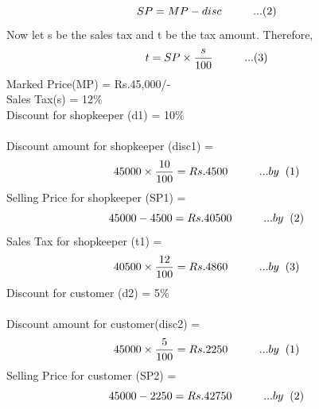 \documentclass[12pt, twocolumn]{article}
\begin{document}
\begin{equation*}
    SP = MP - disc \hspace{1cm}...(2)\\ \\
\end{equation*}
Now let s be the sales tax and t be the tax amount. Therefore,\\
\begin{equation*}
    t = SP\times\frac{s}{100} \hspace{1cm}...(3)\\ \\ \\
\end{equation*}
Marked  Price(MP) = Rs.45,000/- \\
Sales  Tax(s) = 12\% \\
Discount  for  shopkeeper (d1) = 10\% \\ \\
Discount  amount for shopkeeper (disc1) =  \begin{equation*}
    45000\times\frac{10}{100} = Rs.4500 \hspace{1cm}... by \hspace{0.2cm} (1)\\ 
    \end{equation*} 
Selling Price for shopkeeper (SP1) = \begin{equation*}
    45000 - 4500 = Rs.40500 \hspace{1cm}... by \hspace{0.2cm} (2)\\
\end{equation*}
Sales Tax for shopkeeper (t1) = \begin{equation*} \\
    40500\times\frac{12}{100} =  Rs.4860 \hspace{1cm}... by \hspace{0.2cm} (3)\\
\end{equation*}
Discount for customer (d2) = 5\% \\ \\
Discount amount for customer(disc2)  = 
\begin{equation*} 
     45000\times\frac{5}{100} = Rs.2250 \hspace{1cm}... by \hspace{0.2cm} (1)\\
    \end{equation*}
Selling Price for customer (SP2) = \begin{equation*}\\
    45000 - 2250 =  Rs.42750 \hspace{1cm}... by \hspace{0.2cm} (2)\\ 
\end{equation*}
\end{document}
